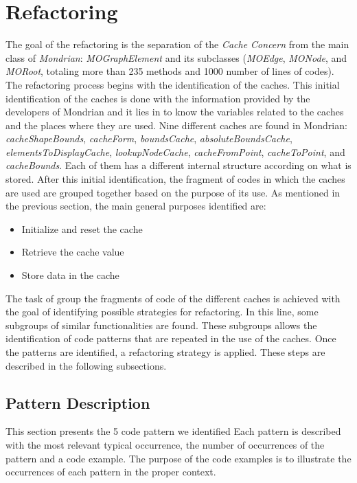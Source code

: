 \documentclass[runningheads]{llncs}
\newcommand{\seclabel}[1]{\label{sec:#1}}
\begin{document}
\section{Refactoring}\seclabel{refactoring}


The goal of the refactoring is the separation of the \emph{Cache
Concern} from the main class of \emph{Mondrian}: \emph{MOGraphElement}
and its subclasses (\emph{MOEdge}, \emph{MONode}, and \emph{MORoot}, totaling more than 235 methods and 1000 number of lines of codes).
The refactoring process begins with the identification of the caches.
This initial identification of the caches is done with the information
provided by the developers of Mondrian and it lies in to know the
variables related to the caches and the places where they are used.
Nine different caches are found in Mondrian: \emph{cacheShapeBounds},
\emph{cacheForm}, \emph{boundsCache}, \emph{absoluteBoundsCache},
\emph{elementsToDisplayCache}, \emph{lookupNodeCache}, \emph{cacheFromPoint},
\emph{cacheToPoint}, and \emph{cacheBounds}. Each of them has a different
internal structure according on what is stored. After this initial
identification, the fragment of codes in which the caches are used
are grouped together based on the purpose of its use. As mentioned
in the previous section, the main general purposes identified are: 
\begin{itemize}
\item Initialize and reset the cache
\item Retrieve the cache value
\item Store data in the cache
\end{itemize}
The task of group the fragments of code of the different caches is
achieved with the goal of identifying possible strategies for refactoring.
In this line, some subgroups of similar functionalities are found.
These subgroups allows the identification of code patterns that are
repeated in the use of the caches. Once the patterns are identified,
a refactoring strategy is applied. These steps are described in the
following subsections.


\subsection{Pattern Description\label{sub:Pattern-Identification}}

This section presents the 5 code pattern we identified 
Each pattern is described with the most relevant typical occurrence,
the number of occurrences of the pattern and a code example. The purpose
of the code examples is to illustrate the occurrences of each pattern
in the proper context.
\end{document}
